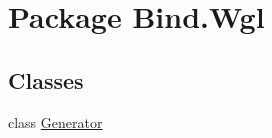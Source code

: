 \hypertarget{namespace_bind_1_1_wgl}{
\section{Package Bind.Wgl}
\label{namespace_bind_1_1_wgl}
}
\subsection*{Classes}
\begin{DoxyCompactItemize}
\item 
class \hyperlink{class_bind_1_1_wgl_1_1_generator}{Generator}
\end{DoxyCompactItemize}
